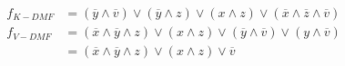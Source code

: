 \documentclass[11pt]{scrartcl}
\begin{document}
\begin{align*}
    f_{K-DMF} &=
    (\overline{y} \land \overline{v}) \lor
    (\overline{y} \land z) \lor
    (x \land z) \lor
    (\overline{x} \land \overline{z} \land \overline{v})\\
    f_{V-DMF} &=
    (\overline{x} \land \overline{y} \land z) \lor
    (x \land z) \lor
    (\overline{y} \land \overline{v}) \lor
    (y \land \overline{v})\\
    &=
    (\overline{x} \land \overline{y} \land z) \lor
    (x \land z) \lor
    \overline{v}
\end{align*}
\end{document}
